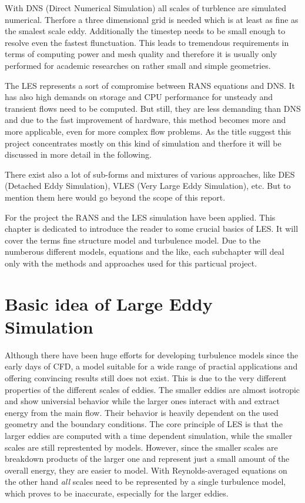 With DNS (Direct Numerical Simulation) all scales of turblence are simulated numerical. Therfore a three dimensional grid is needed which is at least as fine as the smalest scale eddy. Additionally the timestep needs to be small enough to resolve even the fastest flunctuation. This leads to tremendous requirements in terms of computing power and mesh quality and therefore it is usually only performed for academic researches on rather small and simple geometries.

The LES represents a sort of compromise between RANS equations and DNS. It has also high demands on storage and CPU performance for unsteady and transient flows need to be computed. But still, they are less demanding than DNS and due to the fast improvement of hardware, this method becomes more and more applicable, even for more complex flow problems. As the title suggest this project concentrates mostly on this kind of simulation and therfore it will be discussed in more detail in the following.

There exist also a lot of sub-forms and mixtures of various approaches, like DES (Detached Eddy Simulation), VLES (Very Large Eddy Simulation), etc. But to mention them here would go beyond the scope of this report.

For the project the RANS and the LES simulation have been applied. This chapter is dedicated to introduce the reader to some crucial basics of LES. It will cover the terms fine structure model and turbulence model. Due to the numberous different models, equations and the like, each subchapter will deal only with the methods and approaches used for this particual project.
\section{Basic idea of Large Eddy Simulation}
Although there have been huge efforts for developing turbulence models since the early days of CFD, a model suitable for a wide range of practial applications and offering convincing results still does not exist. This is due to the very different properties of the different scales of eddies. The smaller eddies are almost isotropic and show universial behavior while the larger ones interact with and extract energy from the main flow. Their behavior is heavily dependent on the used geometry and the boundary conditions.
The core principle of LES is that the larger eddies are computed with a time dependent simulation, while the smaller scales are still represtented by models. However, since the smaller scales are breakdown products of the larger one and represent just a small amount of the overall energy, they are easier to model. With Reynolds-averaged equations on the other hand \emph{all} scales need to be represented by a single turbulence model, which proves to be inaccurate, especially for the larger eddies.

